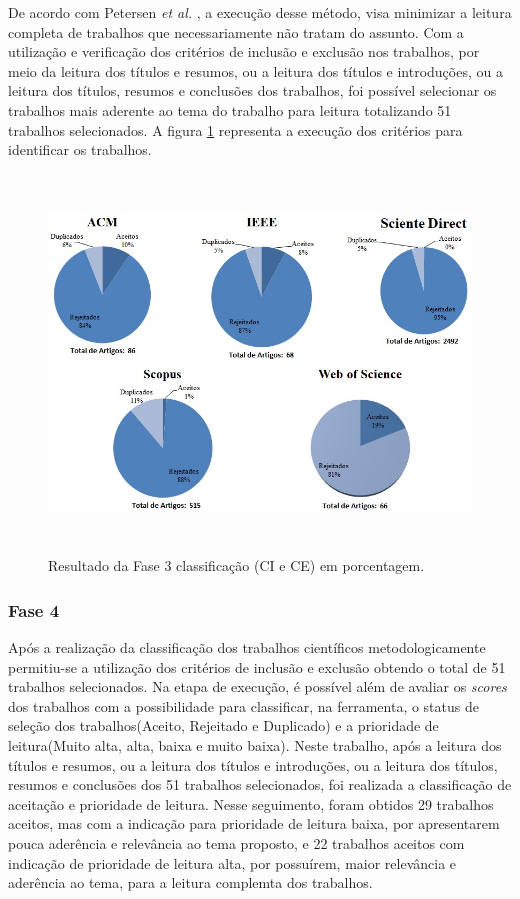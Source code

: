 De acordo com Petersen \textit{et al.} \cite{petersen2008systematic}, a execução desse método, visa minimizar a leitura completa de trabalhos que necessariamente não tratam do assunto. Com a utilização e verificação dos critérios de inclusão e exclusão nos trabalhos, por meio da leitura dos títulos e resumos, ou a leitura dos títulos e introduções, ou a leitura dos títulos, resumos e conclusões dos trabalhos, foi possível selecionar os trabalhos mais aderente ao tema do trabalho para leitura totalizando 51 trabalhos selecionados. A figura \ref{fig:fase3Criterios} representa a execução dos critérios para identificar os trabalhos.

\begin{figure}[H]
\centering
\includegraphics[width = 13cm, height=10cm]{img/Classificacao_FASE_3_CI_e_CE.jpg}
\caption{Resultado da Fase 3 classificação (CI e CE) em porcentagem.}
\label{fig:fase3Criterios}
\end{figure}

\subsubsection{Fase 4} Após a realização da classificação dos trabalhos científicos metodologicamente permitiu-se a utilização dos critérios de inclusão e exclusão obtendo o total de 51 trabalhos selecionados. Na etapa de execução, é possível além de avaliar os \textit{scores} dos trabalhos com a possibilidade para classificar, na ferramenta, o status de seleção dos trabalhos(Aceito, Rejeitado e Duplicado) e a prioridade de leitura(Muito alta, alta, baixa e muito baixa). Neste trabalho, após a leitura dos títulos e resumos, ou a leitura dos títulos e introduções, ou a leitura dos títulos, resumos e conclusões dos 51 trabalhos selecionados, foi realizada a classificação de aceitação e prioridade de leitura. Nesse seguimento, foram obtidos 29 trabalhos aceitos, mas com a indicação para prioridade de leitura baixa, por apresentarem pouca aderência e relevância ao tema proposto, e 22 trabalhos aceitos com indicação de prioridade de leitura alta, por possuírem, maior relevância e aderência ao tema, para a leitura complemta dos trabalhos.   

